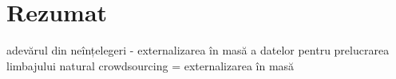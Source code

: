 \manualmark
{}

\chapter*{Rezumat}

adevărul din neînțelegeri  - externalizarea în masă a datelor pentru prelucrarea limbajului natural
crowdsourcing = externalizarea în masă %